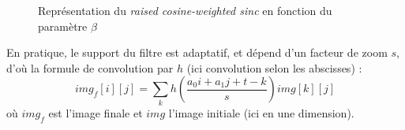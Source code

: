 	\begin{figure}
		\centering
		\caption{Représentation du \emph{raised cosine-weighted sinc} en fonction du paramètre $\beta$}
		\label{szeliski_plotRaisedCosine}
	\end{figure}
	
	En pratique, le support du filtre est adaptatif, et dépend d'un facteur de zoom $s$, d'où la formule de convolution par $h$ (ici convolution selon les abscisses) :
	\[ img_f[i][j] = \displaystyle{\sum_k}h\left(\frac{a_0i+a_1j+t-k}{s}\right)img[k][j]\]
	où $img_f$ est l'image finale et $img$ l'image initiale (ici en une dimension).
	
